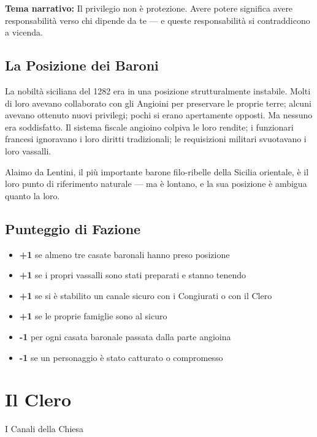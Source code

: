 \textbf{Tema narrativo:} Il privilegio non è protezione. Avere potere
significa avere responsabilità verso chi dipende da te — e queste
responsabilità si contraddicono a vicenda.

\subsection{La Posizione dei Baroni}

La nobiltà siciliana del 1282 era in una posizione strutturalmente
instabile. Molti di loro avevano collaborato con gli Angioini per
preservare le proprie terre; alcuni avevano ottenuto nuovi privilegi;
pochi si erano apertamente opposti. Ma nessuno era soddisfatto.
Il sistema fiscale angioino colpiva le loro rendite; i funzionari
francesi ignoravano i loro diritti tradizionali; le requisizioni
militari svuotavano i loro vassalli.

Alaimo da Lentini, il più importante barone filo-ribelle della Sicilia
orientale, è il loro punto di riferimento naturale — ma è lontano, e
la sua posizione è ambigua quanto la loro.

\subsection{Punteggio di Fazione}

\begin{itemize}[nosep]
  \item \textbf{+1} se almeno tre casate baronali hanno preso posizione
  \item \textbf{+1} se i propri vassalli sono stati preparati e
    stanno tenendo
  \item \textbf{+1} se si è stabilito un canale sicuro con i Congiurati
    o con il Clero
  \item \textbf{+1} se le proprie famiglie sono al sicuro
  \item \textbf{-1} per ogni casata baronale passata dalla parte angioina
  \item \textbf{-1} se un personaggio è stato catturato o compromesso
\end{itemize}

\secsep

\section{Il Clero}
\textcolor{oro}{\cinzel\large I Canali della Chiesa}

\filetto

